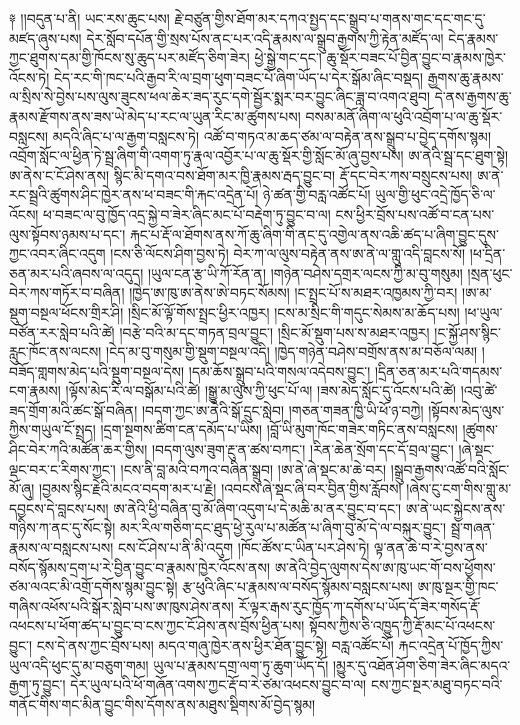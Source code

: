 \documentclass{article}
\begin{document}
༈ །།བདུན་པ་ནི། ཡང་རས་ཆུང་པས། རྗེ་བཙུན་གྱིས་ཐོག་མར་དཀའ་སྤྱད་དང་སྒྲུབ་པ་གནས་གང་དང་གང་དུ་མཛད་ཞུས་པས། དེར་སློབ་དཔོན་གྱི་སྲས་པོས་ནང་པར་འདི་རྣམས་ལ་སྒྲུབ་རྒྱགས་ཀྱི་རྟེན་མཛོད་ལ། ངེད་རྣམས་ཀྱང་ཐུགས་དམ་གྱི་ཁོངས་སུ་ཆུད་པར་མཛོད་ཅིག་ཟེར། ཕྱེ་སྒྱེ་གང་དང་། ཆུ་སྡོར་བཟང་པོ་བྱིན་བྱུང་བ་རྣམས་ཁྱེར་འོངས་ཏེ། ངེད་རང་གི་ཁང་པའི་རྒྱབ་རི་ལ་བྲག་ཕུག་བཟང་པོ་ཞིག་ཡོད་པ་དེར་སྒོམ་ཞིང་བསྡད། རྒྱགས་ཆུ་རྣམས་ལ་སྲིས་སེ་བྱེས་པས་ལུས་ཟུངས་ཕལ་ཆེར་ཟད་རུང་དགེ་སྦྱོར་སྨར་བར་བྱུང་ཞིང་ཟླ་བ་འགའ་ཐུབ། དེ་ནས་རྒྱགས་ཆུ་རྣམས་རྫོགས་ནས་ཟས་ཡེ་མེད་པ་རང་ལ་ཡུན་རིང་མ་ཚུགས་པས། བསམ་མནོ་ཞིག་ལ་ཕུའི་འབྲོག་པ་ལ་ཆུ་སྡོར་བསླངས། མདའི་ཞིང་པ་ལ་རྒྱག་བསླངས་ཏེ། འཚོ་བ་གཏའ་མ་ཆད་ཙམ་ལ་བརྟེན་ནས་སྒྲུབ་པ་བྱེད་དགོས་སྙམ། འབྲོག་སློང་ལ་ཕྱིན་ཏེ་སྦྲ་ཞིག་གི་འགག་ཏུ་རྣལ་འབྱོར་པ་ལ་ཆུ་སྡོར་གྱི་སློང་མོ་ཞུ་བྱས་པས། ཨ་ནེའི་སྦྲ་དང་ཐུག་སྟེ། ཨ་ནེས་ང་ངོ་ཤེས་ནས། སྙིང་མི་དགའ་བས་ཐོག་མར་ཁྱི་རྣམས་རྦད་བྱུང་བ། རྡོ་དང་བེར་ཀས་བསྲུངས་པས། ཨ་ནེ་རང་སྦྲའི་ཚུགས་ཤིང་ཁྱེར་ནས་ཕ་བཟང་གི་རྐང་འདྲེན་པོ། ཉེ་ཚན་གྱི་བརླ་འཚོང་པོ། ཡུལ་གྱི་ཕུང་འདྲེ་ཁྱོད་ཅི་ལ་འོངས། ཕ་བཟང་ལ་བུ་ཁྱོད་འདྲ་སྐྱེ་བ་ཟེར་ཞིང་མང་པོ་བརྡེག་ཏུ་བྱུང་བ་ལ། ངས་ཕྱིར་བྲོས་པས་འཚོ་བ་ངན་པས་ལུས་སྟོབས་ཉམས་པ་དང་། རྐང་པ་རྡོ་ལ་ཐོགས་ནས་ཀོ་ཆུ་ཞིག་གི་ནང་དུ་འགྱེལ་ནས་འཆི་ཚད་པ་ཞིག་བྱུང་དུས་ཀྱང་འབར་ཞིང་འདུག །ངས་ཅི་ལོངས་ཤིག་བྱས་ཏེ། བེར་ཀ་ལ་ལུས་བརྟེན་ནས་ཨ་ནེ་ལ་གླུ་འདི་བླངས་སོ། །ཕ་དྲིན་ཅན་མར་པའི་ཞབས་ལ་འདུད། །ཡུལ་ངན་རྩ་ཡི་ཀོ་རོན་ན། །གཉེན་བཤེས་དགྲར་ལངས་ཀྱི་མ་བུ་གསུམ། །སྲན་ཕུང་བེར་ཀས་གཏོར་བ་བཞིན། །ཁྱེད་ཨ་ཁུ་ཨ་ནེས་ཨེ་བཏང་སོམས། །ང་སྤྲང་པོ་ས་མཐར་འཁྱམས་ཀྱི་བར། །ཨ་མ་སྡུག་བསྔལ་ཕོངས་གྲིར་ཤི། །སྲིང་མོ་ལྟོ་གོས་སྤྲང་ཕྱིར་འཁྱར། །ངས་མ་སྲིང་གི་གདུང་སེམས་མ་ཆོད་པས། །ཕ་ཡུལ་བཙོན་རར་སླེབ་པའི་ཚེ། །བརྩེ་བའི་མ་དང་གཏན་བྲལ་བྱུང་། །སྲིང་མོ་སྡུག་པས་ས་མཐར་འཁྱར། །ང་སྐྱོ་ཤས་སྙིང་རླུང་ཁོང་ནས་ལངས། །ངེད་མ་བུ་གསུམ་གྱི་སྡུག་བསྔལ་འདི། །ཁྱེད་གཉེན་བཤེས་བགྲོས་ནས་མ་བཅོལ་ལམ། །བཟོད་གླགས་མེད་པའི་སྡུག་བསྔལ་དེས། །དམ་ཆོས་སྒྲུབ་པའི་གསལ་འདེབས་བྱུང་། །དྲིན་ཅན་མར་པའི་གདམས་ངག་རྣམས། །ལྟོས་མེད་རི་ལ་བསྒོམ་པའི་ཚེ། །སྒྱུ་མ་ལུས་ཀྱི་ཕུང་པོ་ལ། །ཟས་མེད་སློང་དུ་འོངས་པའི་ཚེ། །འབུ་ཚེ་ཟད་གྲོག་མའི་ཚང་སྒོ་བཞིན། །བདག་ཀྱང་ཨ་ནེའི་སྒོ་དྲུང་སླེབ། །གཅན་གཟན་ཁྱི་ཡི་ཕོ་ཉ་བཀྱེ། །སྟོབས་མེད་ལུས་ཀྱིས་གཡུལ་ངོ་སྤྲད། །དྲག་སྔགས་ཚིག་ངན་དམོད་པ་ཡིས། །བློ་ཡི་མུག་ཁོང་གཟེར་གཏིང་ནས་བསླངས། །ཚུགས་ཤིང་བེར་ཀའི་མཚོན་ཆར་གྱིས། །བདག་ལུས་ཟུག་རྔུ་ན་ཚས་བཀང་། །རིན་ཆེན་སྲོག་དང་དོ་བྲལ་བྱུང་། །ཞེ་སྡང་ལྡང་བར་ང་རིགས་ཀྱང་། །ངས་ནི་བླ་མའི་བཀའ་བཞིན་སྒྲུབ། །ཨ་ནེ་ཞེ་སྡང་མ་ཆེ་བར། །སྒྲུབ་རྒྱགས་འཚོ་བའི་སློང་མོ་ཞུ། །བྱམས་སྙིང་རྗེའི་མངའ་བདག་མར་པ་རྗེ། །འབངས་ཞེ་སྡང་ཞི་བར་བྱིན་གྱིས་རློབས། །ཞེས་ངུ་ངག་གིས་གླུ་མ་དབྱངས་དེ་བླངས་པས། ཨ་ནེའི་ཕྱི་བཞིན་བུ་མོ་ཞིག་འདུག་པ་དེ་མཆི་མ་ནར་བྱུང་བ་དང་། ཨ་ནེ་ཡང་སྐྱེངས་ནས་གཉིས་ཀ་ནང་དུ་སོང་སྟེ། མར་རིལ་གཅིག་དང་ཐུད་ཕྱེ་རུལ་པ་མཚོན་པ་ཞིག་བུ་མོ་དེ་ལ་བསྐུར་བྱུང་། སྦྲ་གཞན་རྣམས་ལ་བསླངས་པས། ངས་ངོ་ཤེས་པ་ནི་མི་འདུག །ཁོང་ཚོས་ང་ཡིན་པར་ཤེས་ཏེ། ལྟ་ནན་ཆེ་བ་རེ་བྱས་ནས་བསོད་སྙོམས་དྲག་པ་རེ་བྱིན་བྱུང་བ་རྣམས་ཁྱེར་འོངས་ནས། ཨ་ནེའི་བྱེད་ལུགས་དེས་ཨ་ཁུ་ཡང་གོ་བས་ཕྱོགས་ཙམ་ལའང་མི་འགྲོ་དགོས་སྙམ་བྱུང་སྟེ། རྩ་ཕུའི་ཞིང་པ་རྣམས་ལ་བསོད་སྙོམས་བསླངས་པས། ཨ་ཁུ་སྔར་གྱི་ཁང་གཞིས་འཕོས་པའི་སྒོར་སླེབ་པས་ཨ་ཁུས་ཤེས་ནས། རོ་ལྟར་རྒས་རུང་ཁྱོད་ཀ་དགོས་པ་ཡོད་དོ་ཟེར་གསོད་རྡོ་འཕངས་པ་ཕོག་ཚད་པ་བྱུང་བ་ངས་ཀྱང་ངོ་ཤེས་ནས་བྲོས་ཕྱིན་པས། སྟོབས་ཀྱིས་ཅི་འཁྱུད་ཀྱི་རྡོ་མང་པོ་འཕངས་བྱུང་། ངས་དེ་ནས་ཀྱང་བྲོས་པས། མདའ་གཞུ་ཁྱེར་ནས་ཕྱིར་ཐོན་བྱུང་སྟེ། བརླ་འཚོང་པོ། རྐང་འདྲེན་པོ་ཁྱོད་ཀྱིས་ཡུལ་འདི་ཕུང་དུ་མ་བཅུག་གམ། ཡུལ་པ་རྣམས་དགྲ་ལག་ཏུ་ཆུག་ཡོད་དོ། །མྱུར་དུ་འཐོན་ཤོག་ཅིག་ཟེར་ཞིང་མདའ་རྒྱག་ཏུ་བྱུང་། དེར་ཡུལ་པའི་ཕོ་གཞོན་འགས་ཀྱང་རྡོ་བ་རེ་ཙམ་འཕངས་བྱུང་བ་ལ། ངས་ཀྱང་སྔར་མཐུ་བཏང་བའི་གནོང་གིས་གང་མིན་བྱུང་གིས་དོགས་ནས་མཐུས་སྡིགས་མོ་བྱེད་སྙམ། 
\end{document}
